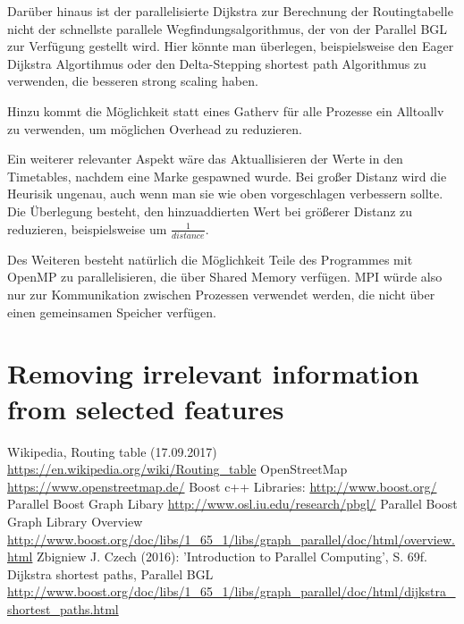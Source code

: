 \documentclass[paper=A4,pagesize=auto,12pt,headinclude=true,footinclude=true,BCOR=0mm,DIV=calc]{scrartcl}
\begin{document}
	
	Darüber hinaus ist der parallelisierte Dijkstra zur Berechnung der Routingtabelle nicht der schnellste parallele Wegfindungsalgorithmus, der von der Parallel BGL zur Verfügung gestellt wird. Hier könnte man überlegen, beispielsweise den Eager Dijkstra Algortihmus oder den Delta-Stepping shortest path Algorithmus zu verwenden, die besseren strong scaling haben.
	
	
	Hinzu kommt die Möglichkeit statt eines Gatherv für alle Prozesse ein Alltoallv zu verwenden, um möglichen Overhead zu reduzieren.
	
	Ein weiterer relevanter Aspekt wäre das Aktuallisieren der Werte in den Timetables, nachdem eine Marke gespawned wurde. Bei großer Distanz wird die Heurisik ungenau, auch wenn man sie wie oben vorgeschlagen verbessern sollte. Die Überlegung besteht, den hinzuaddierten Wert bei größerer Distanz zu reduzieren, beispielsweise um $\frac{1}{distance}$.
	
	Des Weiteren besteht natürlich die Möglichkeit Teile des Programmes mit OpenMP zu parallelisieren, die über Shared Memory verfügen. MPI würde also nur zur Kommunikation zwischen Prozessen verwendet werden, die nicht über einen gemeinsamen Speicher verfügen.
	
	\section{Removing irrelevant information from selected features}
	
	
	
	\newpage
	
	\begin{thebibliography}{xxxxxx}
		Wikipedia, Routing table  (17.09.2017) \url{https://en.wikipedia.org/wiki/Routing_table}
		 OpenStreetMap \url{https://www.openstreetmap.de/}
		 Boost c++ Libraries: \url{http://www.boost.org/}
		 Parallel Boost Graph Libary \url{http://www.osl.iu.edu/research/pbgl/}
		 Parallel Boost Graph Library Overview \url{http://www.boost.org/doc/libs/1_65_1/libs/graph_parallel/doc/html/overview.html}
		 Zbigniew J. Czech (2016): 'Introduction to Parallel Computing', S. 69f.
		 Dijkstra shortest paths, Parallel BGL \url{http://www.boost.org/doc/libs/1_65_1/libs/graph_parallel/doc/html/dijkstra_shortest_paths.html}
	\end{thebibliography}
	

	
	
\end{document}
